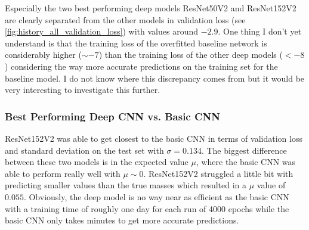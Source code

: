 Especially the two best performing deep models ResNet50V2 and ResNet152V2 are clearly separated from the other models in validation loss (see \autoref{fig:history_all_validation_loss}) with values around $-2.9$. One thing I don't yet understand is that the training loss of the overfitted baseline network is considerably higher ($\sim -7$) than the training loss of the other deep models ($< -8 $) considering the way more accurate predictions on the training set for the baseline model. I do not know where this discrepancy comes from but it would be very interesting to investigate this further. 

\subsubsection{Best Performing Deep CNN vs. Basic CNN}
ResNet152V2 was able to get closest to the basic CNN in terms of validation loss and standard deviation on the test set with $\sigma = 0.134$. The biggest difference between these two models is in the expected value $\mu$, where the basic CNN was able to perform really well with $\mu \sim 0$. ResNet152V2 struggled a little bit with predicting smaller values than the true masses which resulted in a $\mu$ value of $0.055$. Obviously, the deep model is no way near as efficient as the basic CNN with a training time of roughly one day for each run of 4000 epochs while the basic CNN only takes minutes to get more accurate predictions. 

